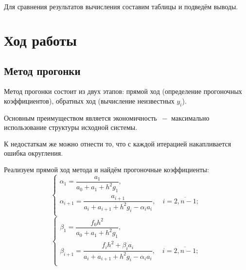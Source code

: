 \documentclass[a4paper,12pt]{article}
\begin{document}
{Для сравнения результатов вычисления составим таблицы и подведём выводы.
\section{Ход работы}
\subsection{Метод прогонки}
\hspace*{1.25cm} Метод прогонки состоит из двух этапов: прямой ход (определение прогоночных коэффициентов), 
обратных ход (вычисление неизвестных $y_i$).

Основным преимуществом является экономичность $~-$ максимально использование структуры исходной системы.

К недостаткам же можно отнести то, что с каждой итерацией накапливается ошибка округления.


Реализуем прямой ход метода и найдём прогоночные коэффициенты:
\begin{equation}
    \begin{cases}
        \alpha_1 = \dfrac{a_1}{a_0 + a_1 + h^2g_1},\\
        \alpha_{i+1} = \dfrac{a_{i+1}}{a_i + a_{i+1} + h^2g_i - \alpha_ia_i}, \quad i = \overline{2, n - 1};\\
    \end{cases}
\end{equation}
\begin{equation}
    \begin{cases}
        \beta_1 = \dfrac{f_0h^2}{a_0 + a_1 + h^2g_1},\\
        \beta_{i+1} = \dfrac{f_ih^2 + \beta_ia_i}{a_i + a_{i+1} + h^2g_i - \alpha_ia_i}, \quad i = \overline{2, n - 1};\\
    \end{cases}
\end{equation}

}
\end{document}

